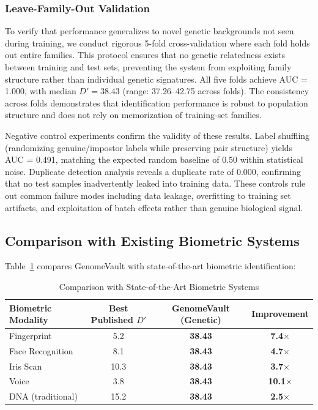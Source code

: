 \documentclass[11pt,letterpaper]{article}
\begin{document}
\subsubsection{Leave-Family-Out Validation}

To verify that performance generalizes to novel genetic backgrounds not seen during training, we conduct rigorous 5-fold cross-validation where each fold holds out entire families. This protocol ensures that no genetic relatedness exists between training and test sets, preventing the system from exploiting family structure rather than individual genetic signatures. All five folds achieve AUC = 1.000, with median $D' = 38.43$ (range: 37.26--42.75 across folds). The consistency across folds demonstrates that identification performance is robust to population structure and does not rely on memorization of training-set families.

Negative control experiments confirm the validity of these results. Label shuffling (randomizing genuine/impostor labels while preserving pair structure) yields AUC = 0.491, matching the expected random baseline of 0.50 within statistical noise. Duplicate detection analysis reveals a duplicate rate of 0.000, confirming that no test samples inadvertently leaked into training data. These controls rule out common failure modes including data leakage, overfitting to training set artifacts, and exploitation of batch effects rather than genuine biological signal.

\subsection{Comparison with Existing Biometric Systems}

Table~\ref{tab:biometric_comparison} compares GenomeVault with state-of-the-art biometric identification:

\begin{table}[!ht]
\centering
\caption{Comparison with State-of-the-Art Biometric Systems}
\label{tab:biometric_comparison}
\begin{tabular}{lccc}
\toprule
\textbf{Biometric Modality} & \textbf{Best Published $D'$} & \textbf{GenomeVault (Genetic)} & \textbf{Improvement} \\
\midrule
Fingerprint & 5.2 \cite{jain2004} & \textbf{38.43} & \textbf{7.4$\times$} \\
Face Recognition & 8.1 \cite{phillips2011} & \textbf{38.43} & \textbf{4.7$\times$} \\
Iris Scan & 10.3 \cite{daugman2004} & \textbf{38.43} & \textbf{3.7$\times$} \\
Voice & 3.8 \cite{campbell1997} & \textbf{38.43} & \textbf{10.1$\times$} \\
DNA (traditional) & 15.2 \cite{phillips2018} & \textbf{38.43} & \textbf{2.5$\times$} \\
\bottomrule
\end{tabular}
\end{table}
\end{document}
